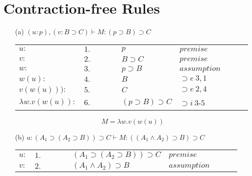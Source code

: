 \documentclass[11pt,a4paper]{article}
\begin{document}
\section{Contraction-free Rules}

\begin{itemize}
\item[(a)]
  $(u:p), (v:B \supset C) \vdash M: (p\supset B) \supset C$
		\begin{table}[H]
		\centering
		\begin{tabular}{*{10}{l}}
			
			$u:$ & $1.$ & & & & $p$ & $premise$ & & &\\
			
			$v:$ & $2.$ & & &  & $B \supset C$ & $premise$ & & &\\
			
			\cline{3-10}
			
			$w:$ & $3.$ & \multicolumn{1}{|c}{} & &  & $p \supset B$ & $assumption$ & & &\multicolumn{1}{c|}{}\\
			
			$w(u):$ & $4.$ & \multicolumn{1}{|c}{} & &  & $B$ & $\supset e \ 3, 1$ & & &\multicolumn{1}{c|}{}\\
			
			$v(w(u))):$ & $5.$ & \multicolumn{1}{|c}{} & &  & $C$ & $\supset e \ 2, 4$ & & &\multicolumn{1}{c|}{}\\
			
			\cline{3-10}
			
			$\lambda w . v(w(u)):$ & $6.$ & & & & $(p \supset B) \supset C$ & $\supset i \ 3$-$5$ & & & \\
			
		\end{tabular}
		\end{table}
		
		\[ \boxed{M = \lambda w . v(w(u))} \]
		
		
\item[(b)]
  $u: (A_1 \supset (A_2 \supset B)) \supset C \vdash M: ((A_1 \wedge A_2) \supset B) \supset C$
		\begin{table}[H]
		\centering
		\begin{tabular}{*{10}{l}}
			
			$u:$ & $1.$ & & & & $(A_1 \supset (A_2 \supset B)) \supset C$ & $premise$ & & &\\
			
			\cline{3-10}
			
			$v:$ & $2.$ & \multicolumn{1}{|c}{} & &  & $(A_1 \wedge A_2) \supset B$ & $assumption$ & & &\multicolumn{1}{c|}{}\\
			

\end{tabular}
\end{table}
\end{itemize}
\end{document}
